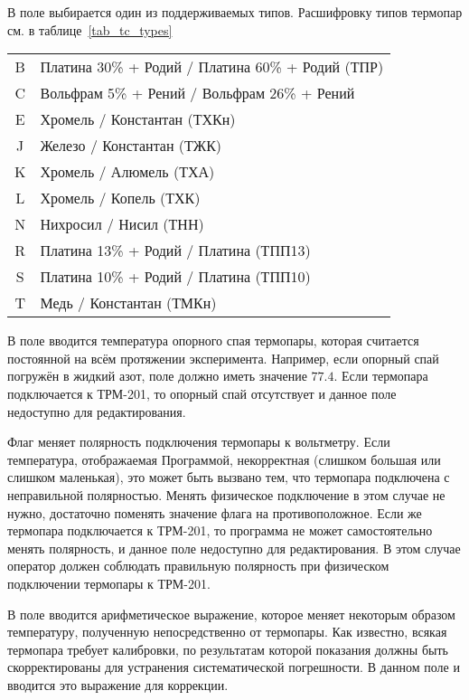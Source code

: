 В поле  выбирается один из поддерживаемых типов. Расшифровку типов термопар см. в таблице~\ref{tab_tc_types}

\begin{table*}
\begin{center}
\caption{Типы термопар}
\begin{tabular}{cl}
\hline \hline
B & Платина 30\% + Родий / Платина 60\% + Родий (ТПР) \\
C & Вольфрам 5\% + Рений / Вольфрам 26\% + Рений \\
E & Хромель / Константан (ТХКн) \\
J & Железо / Константан (ТЖК) \\
K & Хромель / Алюмель (ТХА) \\
L & Хромель / Копель (ТХК) \\
N & Нихросил / Нисил (ТНН) \\
R & Платина 13\% + Родий / Платина (ТПП13) \\
S & Платина 10\% + Родий / Платина (ТПП10) \\
T & Медь / Константан (ТМКн) \\
\hline \hline
\end{tabular}
\label{tab_tc_types}
\end{center}
\end{table*}

В поле  вводится температура опорного спая термопары, которая считается постоянной на всём протяжении эксперимента. Например, если опорный спай погружён в жидкий азот, поле должно иметь значение $77.4$. Если термопара подключается к ТРМ-201, то опорный спай отсутствует и данное поле недоступно для редактирования.

Флаг  меняет полярность подключения термопары к вольтметру. Если температура, отображаемая Программой, некорректная (слишком большая или слишком маленькая), это может быть вызвано тем, что термопара подключена с неправильной полярностью. Менять физическое подключение в этом случае не нужно, достаточно поменять значение флага на противоположное. Если же термопара подключается к ТРМ-201, то программа не может самостоятельно менять полярность, и данное поле недоступно для редактирования. В этом случае оператор должен соблюдать правильную полярность при физическом подключении термопары к ТРМ-201.

В поле  вводится арифметическое выражение, которое меняет некоторым образом температуру, полученную непосредственно от термопары. Как известно, всякая термопара требует калибровки, по результатам которой показания должны быть скорректированы для устранения систематической погрешности. В данном поле и вводится это выражение для коррекции.

